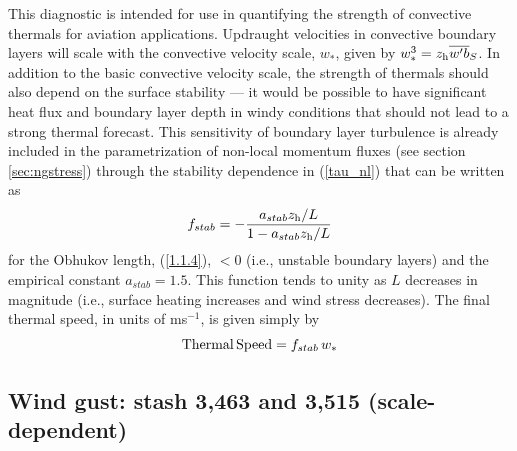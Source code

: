 \documentclass{UMDP_article}
\begin{document}
This diagnostic is intended for use in quantifying the strength of
convective thermals for aviation applications.  Updraught velocities
in convective boundary layers will scale with the convective velocity
scale, $w_*$, given by $ w_*^3 = z_{\rm h} \overline{w'b}_S $.  In addition to the
basic convective velocity scale, the strength of thermals should also
depend on the surface stability --- it would be possible to have
significant heat flux and boundary layer depth in windy conditions
that should not lead to a strong thermal forecast. This sensitivity of
boundary layer turbulence is already included in the parametrization
of non-local momentum fluxes (see section \ref{sec:ngstress}) through
the stability dependence in (\ref{tau_nl}) that can be written as
\begin{equation}
  f_{stab} = - \frac{a_{stab} z_{\rm h}/L }{1 - a_{stab} z_{\rm h}/L}
\end{equation}
for the Obhukov length, (\ref{1.1.4}), $<0$ (\mbox{i.e.}, unstable
boundary layers) and the empirical constant $a_{stab} = 1.5$.  This
function tends to unity as $L$ decreases in magnitude (\mbox{i.e.},
surface heating increases and wind stress decreases).  The final
thermal speed, in units of ms$^{-1}$, is given simply by
\begin{equation}
  {\rm Thermal} \, {\rm Speed} = f_{stab} \, w_* 
\end{equation}

\subsection{Wind gust: stash 3,463 and 3,515 (scale-dependent)}
\end{document}
